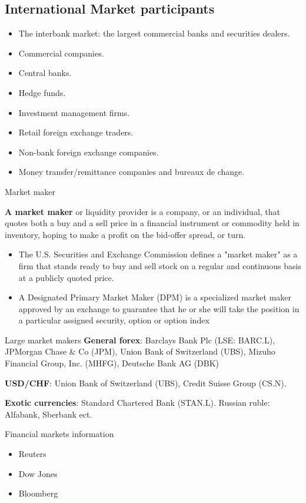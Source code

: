 \documentclass[international_finance_p1.tex]{subfiles}
\begin{document}
\subsection{International Market participants}
\begin{frame}{}
\begin{itemize}[<+->]
\item
The interbank market: the largest commercial banks and securities dealers.
\item
Commercial companies.
\item
Central banks.
\item
Hedge funds.
\item
Investment management firms.
\item
Retail foreign exchange traders.
\item
Non-bank foreign exchange companies.
\item
Money transfer/remittance companies and bureaux de change.
\end{itemize}
\end{frame}
\begin{frame}[shrink=10]{Market maker}
\begin{block}{\textbf{A market maker}}
or liquidity provider is a company, or an individual, that quotes both a buy and a sell price in a financial instrument or commodity held in inventory, hoping to make a profit on the bid-offer spread, or turn.
\end{block}
\begin{itemize}[<+->]
\item
The U.S. Securities and Exchange Commission defines a "market maker" as a firm that stands ready to buy and sell stock on a regular and continuous basis at a publicly quoted price.
\item
A Designated Primary Market Maker (DPM) is a specialized market maker approved by an exchange to guarantee that he or she will take the position in a particular assigned security, option or option index
\end{itemize}
\end{frame}
\begin{frame}{Large market makers}
\textbf{General forex}: Barclays Bank Plc (LSE: BARC.L), JPMorgan Chase \& Co (JPM), Union Bank of Switzerland (UBS), Mizuho Financial Group, Inc. (MHFG), Deutsche Bank AG (DBK)

\textbf{USD/CHF}: Union Bank of Switzerland (UBS), Credit Suisse Group (CS.N).

\textbf{Exotic currencies}: Standard Chartered Bank (STAN.L).
Russian ruble: Alfabank, Sberbank ect.

\end{frame}
\begin{frame}{Financial markets information}
\begin{itemize}[<+->]
\item
Reuters
\item
Dow Jones 
\item
Bloomberg
\end{itemize}
\end{frame}
\end{document}
